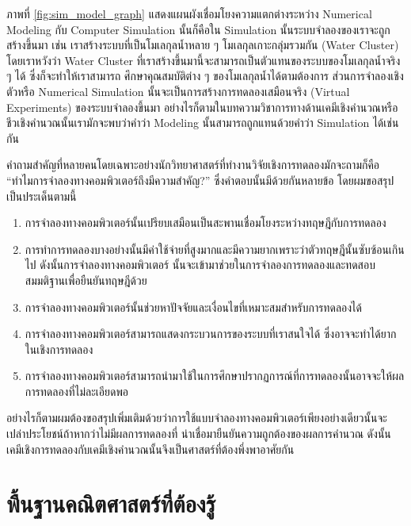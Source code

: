 ภาพที่ \ref{fig:sim_model_graph} แสดงแผนผังเชื่อมโยงความแตกต่างระหว่าง Numerical Modeling กับ Computer Simulation
นั้นก็คือใน Simulation นั้นระบบจำลองของเราจะถูกสร้างขึ้นมา เช่น เราสร้างระบบที่เป็นโมเลกุลน้ำหลาย ๆ โมเลกุลเกาะกลุ่มรวมกัน (Water
Cluster) โดยเราหวังว่า Water Cluster ที่เราสร้างขึ้นมานี้จะสามารถเป็นตัวแทนของระบบของโมเลกุลน้ำจริง ๆ ได้ ซึ่งก็จะทำให้เราสามารถ%
ศึกษาคุณสมบัติต่าง ๆ ของโมเลกุลน้ำได้ตามต้องการ ส่วนการจำลองเชิงตัวหรือ Numerical Simulation นั้นจะเป็นการสร้างการทดลองเสมือนจริง
(Virtual Experiments) ของระบบจำลองขึ้นมา อย่างไรก็ตามในบทความวิชาการทางด้านเคมีเชิงคำนวณหรือชีวเชิงคำนวณนั้นเรามักจะพบว่าคำว่า
Modeling นั้นสามารถถูกแทนด้วยคำว่า Simulation ได้เช่นกัน

คำถามสำคัญที่หลายคนโดยเฉพาะอย่างนักวิทยาศาสตร์ที่ทำงานวิจัยเชิงการทดลองมักจะถามก็คือ \enquote{ทำไมการจำลองทางคอมพิวเตอร์ถึงมีความสำคัญ?}
ซึ่งคำตอบนั้นมีด้วยกันหลายข้อ โดยผมขอสรุปเป็นประเด็นตามนี้

\begin{enumerate}[topsep=0pt,noitemsep]
  \setlength\itemsep{1em}
  \item การจำลองทางคอมพิวเตอร์นั้นเปรียบเสมือนเป็นสะพานเชื่อมโยงระหว่างทฤษฎีกับการทดลอง

  \item การทำการทดลองบางอย่างนั้นมีค่าใช้จ่ายที่สูงมากและมีความยากเพราะว่าตัวทฤษฎีนั้นซับซ้อนเกินไป ดังนั้นการจำลองทางคอมพิวเตอร์%
        นั้นจะเข้ามาช่วยในการจำลองการทดลองและทดสอบสมมติฐานเพื่อยืนยันทฤษฎีด้วย

  \item การจำลองทางคอมพิวเตอร์นั้นช่วยหาปัจจัยและเงื่อนไขที่เหมาะสมสำหรับการทดลองได้

  \item การจำลองทางคอมพิวเตอร์สามารถแสดงกระบวนการของระบบที่เราสนใจได้ ซึ่งอาจจะทำได้ยากในเชิงการทดลอง

  \item การจำลองทางคอมพิวเตอร์สามารถนำมาใช้ในการศึกษาปรากฏการณ์ที่การทดลองนั้นอาจจะให้ผลการทดลองที่ไม่ละเอียดพอ
\end{enumerate}

อย่างไรก็ตามผมต้องขอสรุปเพิ่มเติมด้วยว่าการใช้แบบจำลองทางคอมพิวเตอร์เพียงอย่างเดียวนั้นจะเปล่าประโยชน์ถ้าหากว่าไม่มีผลการทดลองที่%
น่าเชื่อมายืนยันความถูกต้องของผลการคำนวณ ดังนั้นเคมีเชิงการทดลองกับเคมีเชิงคำนวณนั้นจึงเป็นศาสตร์ที่ต้องพึ่งพาอาศัยกัน

\section{พื้นฐานคณิตศาสตร์ที่ต้องรู้}

